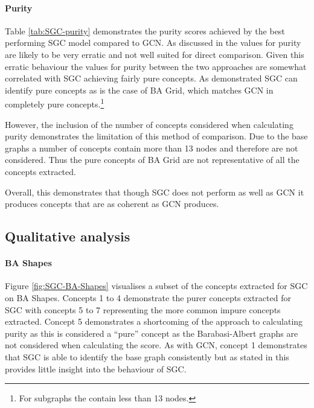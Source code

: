 \paragraph{Purity}


Table \ref{tab:SGC-purity} demonstrates the purity scores achieved by the best performing SGC model compared to GCN.
As discussed in  the values for purity are likely to be very erratic and not well suited for direct comparison.
Given this erratic behaviour the values for purity between the two approaches are somewhat correlated with SGC achieving fairly pure concepts.
As demonstrated SGC can identify pure concepts as is the case of BA Grid, which matches GCN in completely pure concepts.\footnote{For subgraphs the contain less than 13 nodes.}

However, the inclusion of the number of concepts considered when calculating purity demonstrates the limitation of this method of comparison.
Due to the base graphs a number of concepts contain more than 13 nodes and therefore are not considered.
Thus the pure concepts of BA Grid are not representative of all the concepts extracted.

Overall, this demonstrates that though SGC does not perform as well as GCN it produces concepts that are as coherent as GCN produces.

\subsection{Qualitative analysis}
\label{sec:concept-analysis}

\paragraph{BA Shapes}

Figure \ref{fig:SGC-BA-Shapes} visualises a subset of the concepts extracted for SGC on BA Shapes.
Concepts 1 to 4 demonstrate the purer concepts extracted for SGC with concepts 5 to 7 representing the more common impure concepts extracted.
Concept 5 demonstrates a shortcoming of the approach to calculating purity as this is considered a ``pure'' concept as the Barabasi-Albert graphs are not considered when calculating the score. 
As with GCN, concept 1 demonstrates that SGC is able to identify the base graph consistently but as stated in  this provides little insight into the behaviour of SGC.


